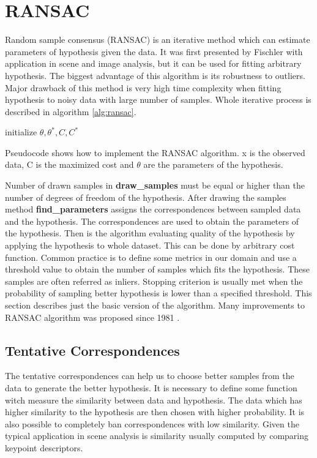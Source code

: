 \section{RANSAC}
Random sample consensus (RANSAC) is an iterative method which can estimate parameters of hypothesis given the data. It was first presented by Fischler \cite{fischler1981} with application in scene and image analysis, but it can be used for fitting arbitrary hypothesis. The biggest advantage of this algorithm is its robustness to outliers. Major drawback of this method is very high time complexity when fitting hypothesis to noisy data with large number of samples. Whole iterative process is described in algorithm \ref{alg:ransac}.
\begin{algorithm}[]
 initialize $\theta, \theta^*, C, C^*$\;
 \caption{Pseudocode shows how to implement the RANSAC algorithm. x is the observed data, C is the maximized cost and $\theta$ are the parameters of the hypothesis.}
 \label{alg:ransac}
\end{algorithm}

Number of drawn samples in \textbf{draw\_samples} must be equal or higher than the number of degrees of freedom of the hypothesis. After drawing the samples method \textbf{find\_parameters} assigns the correspondences between sampled data and the hypothesis. The correspondences are used to obtain the parameters of the hypothesis. Then is the algorithm evaluating quality of the hypothesis by applying the hypothesis to whole dataset. This can be done by arbitrary cost function. Common practice is to define some metrics in our domain and use a threshold value to obtain the number of samples which fits the hypothesis. These samples are often referred as inliers. Stopping criterion is usually met when the probability of sampling better hypothesis is lower than a specified threshold. This section describes just the basic version of the algorithm. Many improvements to RANSAC algorithm was proposed since 1981 \cite{chum2008}.

\subsection{Tentative Correspondences}
The tentative correspondences can help us to choose better samples from the data to generate the better hypothesis. It is necessary to define some function witch measure the similarity between data and  hypothesis. The data which has higher similarity to the hypothesis are then chosen with higher probability. It is also possible to completely ban correspondences with low similarity. Given the typical application in scene analysis is similarity usually computed by comparing keypoint descriptors.


